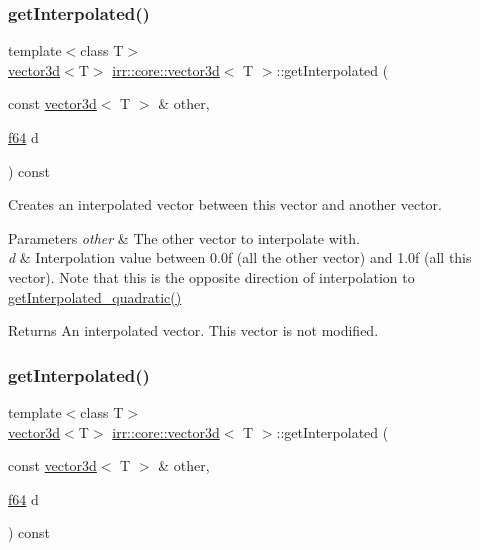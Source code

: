 \subsubsection{\texorpdfstring{get\+Interpolated()}{getInterpolated()}\hspace{0.1cm}{\footnotesize\ttfamily [1/2]}}
{\footnotesize\ttfamily template$<$class T$>$ \\
\hyperlink{classirr_1_1core_1_1vector3d}{vector3d}$<$T$>$ \hyperlink{classirr_1_1core_1_1vector3d}{irr\+::core\+::vector3d}$<$ T $>$\+::get\+Interpolated (\begin{DoxyParamCaption}\item[{const \hyperlink{classirr_1_1core_1_1vector3d}{vector3d}$<$ T $>$ \&}]{other,  }\item[{\hyperlink{namespaceirr_a1325b02603ad449f92c68fc640af9b28}{f64}}]{d }\end{DoxyParamCaption}) const\hspace{0.3cm}{\ttfamily [inline]}}



Creates an interpolated vector between this vector and another vector. 


\begin{DoxyParams}{Parameters}
{\em other} & The other vector to interpolate with. \\
\hline
{\em d} & Interpolation value between 0.\+0f (all the other vector) and 1.\+0f (all this vector). Note that this is the opposite direction of interpolation to \hyperlink{classirr_1_1core_1_1vector3d_aacaa4bbf35d509b1264d1e8e2d48360e}{get\+Interpolated\+\_\+quadratic()} \\
\hline
\end{DoxyParams}
\begin{DoxyReturn}{Returns}
An interpolated vector. This vector is not modified. 
\end{DoxyReturn}
\mbox{\label{classirr_1_1core_1_1vector3d_aee3351232fa6ebd6241a89bebdaeaedf}} 
\subsubsection{\texorpdfstring{get\+Interpolated()}{getInterpolated()}\hspace{0.1cm}{\footnotesize\ttfamily [2/2]}}
{\footnotesize\ttfamily template$<$class T$>$ \\
\hyperlink{classirr_1_1core_1_1vector3d}{vector3d}$<$T$>$ \hyperlink{classirr_1_1core_1_1vector3d}{irr\+::core\+::vector3d}$<$ T $>$\+::get\+Interpolated (\begin{DoxyParamCaption}\item[{const \hyperlink{classirr_1_1core_1_1vector3d}{vector3d}$<$ T $>$ \&}]{other,  }\item[{\hyperlink{namespaceirr_a1325b02603ad449f92c68fc640af9b28}{f64}}]{d }\end{DoxyParamCaption}) const\hspace{0.3cm}{\ttfamily [inline]}}



